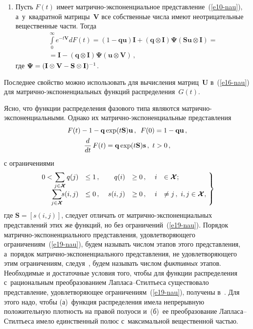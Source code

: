 \begin{multicols}{2}
\begin{enumerate}[1.]
\item Пусть $F(t)$ имеет мат\-рич\-но-экс\-по\-нен\-ци\-аль\-ное  
представление~(\ref{e10-nau}), а~у~квад\-рат\-ной мат\-ри\-цы~$\mathbf{V}$ 
все собственные числа имеют неотрицательные вещественные части. Тогда
\begin{multline*}
\int\limits_0^\infty e^{-t\mathbf{V}}dF(t)=(1-\mathbf{qu}) \mathbf{I}+
(\mathbf{q}\otimes \mathbf{I})\boldsymbol{\Psi}(\mathbf{Su}\otimes 
\mathbf{I})={}\\
{}=\mathbf{I}-(\mathbf{q}\otimes 
\mathbf{I})\boldsymbol{\Psi}(\mathbf{u}\otimes \mathbf{V})\,,
\end{multline*}
где $\boldsymbol{\Psi}=(\mathbf{I}\otimes \mathbf{V}\hm- \mathbf{S}\otimes 
\mathbf{I})^{-1}$. 
  \end{enumerate}
  
  Последнее свойство можно использовать для вычисления 
матриц~$\mathbf{U}$ в~(\ref{e16-nau}) для мат\-рич\-но-экс\-по\-нен\-ци\-аль\-ных 
функций распределения~$G(t)$.
  
  Ясно, что функции распределения фазового типа являются  
мат\-рич\-но-экс\-по\-нен\-ци\-аль\-ны\-ми. Однако их  
мат\-рич\-но-экс\-по\-нен\-ци\-аль\-ные представления 
  \begin{multline*}
  F(t)-1-\mathbf{q}\exp (t\mathbf{S})\mathbf{u}\,,\enskip
    F(0)=1-\mathbf{qu}\,,\\
     \displaystyle\frac{\displaystyle d\mathstrut}{\displaystyle dt\mathstrut}\,F(t)= \mathbf{q}\exp 
(t\mathbf{S})\mathbf{s}\,,\ t>0\,,
  \end{multline*}
с ограничениями
\begin{equation}
\hspace*{-2mm}\left.
\begin{array}{rlrlrl}
\!\!\displaystyle 0<\sum\limits_{j\in \boldsymbol{\mathcal{X}}} q(j)&\leq 1\,,&\ q(i)&\geq0\,,&\ i&\in 
\boldsymbol{\mathcal{X}};
\\[9pt]
\!\!\displaystyle \sum\limits_{j\in \boldsymbol{\mathcal{X}}} \!\!s(i,j)&\leq 0\,,&\ s(i,j)&\geq 0\,,&\ 
i&\not= j\,,\ i, j\in \boldsymbol{\mathcal{X}},
\end{array}\!
\right\}\!\!\!\!
\label{e19-nau}
\end{equation}
где $\mathbf{S}=[s(i,j)]$, следует отличать от мат\-рич\-но-экс\-по\-нен\-ци\-аль\-ных 
представлений этих же функций, но без ограничений~(\ref{e19-nau}). 
Порядок  
мат\-рич\-но-экс\-по\-нен\-ци\-аль\-но\-го представления, удовлетворяющего 
ограничениям~(\ref{e19-nau}), будем называть числом этапов этого 
представления, а~порядок мат\-рич\-но-экс\-по\-нен\-ци\-аль\-но\-го 
представления, не удовлетворяющего этим ограничениям, следуя~\cite{28-nau}, 
будем называть\linebreak
 числом \textit{фиктивных} этапов. Необходимые и 
достаточные условия того, чтобы для функции распределения 
с~рациональным преобразованием Лап\-ла\-са--Стилть\-еса существовало 
представление, \mbox{удовлетворяющее} ограничениям~(\ref{e19-nau}), получены 
в~\cite{29-nau}. Для этого надо, чтобы (а)~функция распределения имела 
непрерывную положительную плотность на правой полуоси и~(б)~ее 
преобразование Лап\-ла\-са--Стилть\-еса имело единственный полюс 
с~максимальной вещественной частью. 


\end{multicols}

